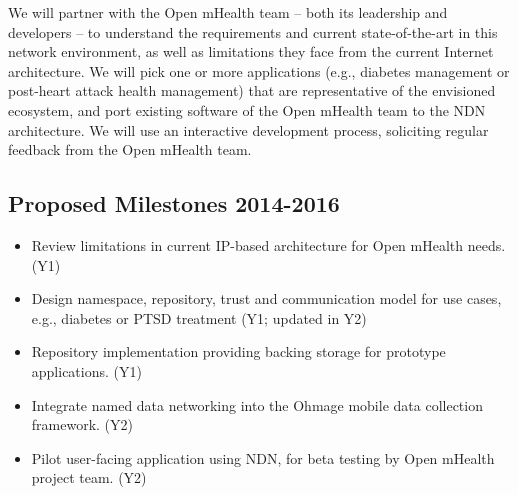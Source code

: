 We will partner with the Open mHealth team -- both its leadership and
developers -- to understand the requirements and current state-of-the-art
in this network environment, as well as limitations they face from the
current Internet architecture. We will pick one or more 
applications (e.g., diabetes management or post-heart attack health management) 
that are representative of the envisioned ecosystem, and port existing software
of the Open mHealth team to the NDN architecture.  We will use an interactive
development process, soliciting regular feedback from the Open mHealth team.   

\subsection{Proposed Milestones 2014-2016}

\begin{itemize}
\item Review limitations in current IP-based architecture for Open mHealth needs. (Y1)
\item Design namespace, repository, trust and communication model for use cases, e.g., diabetes or PTSD treatment (Y1; updated in Y2)
\item Repository implementation providing backing storage for prototype applications. (Y1)
\item Integrate named data networking into the Ohmage mobile data collection framework. (Y2)
\item Pilot user-facing application using NDN, for beta testing by Open mHealth project team. (Y2)
\end{itemize}






